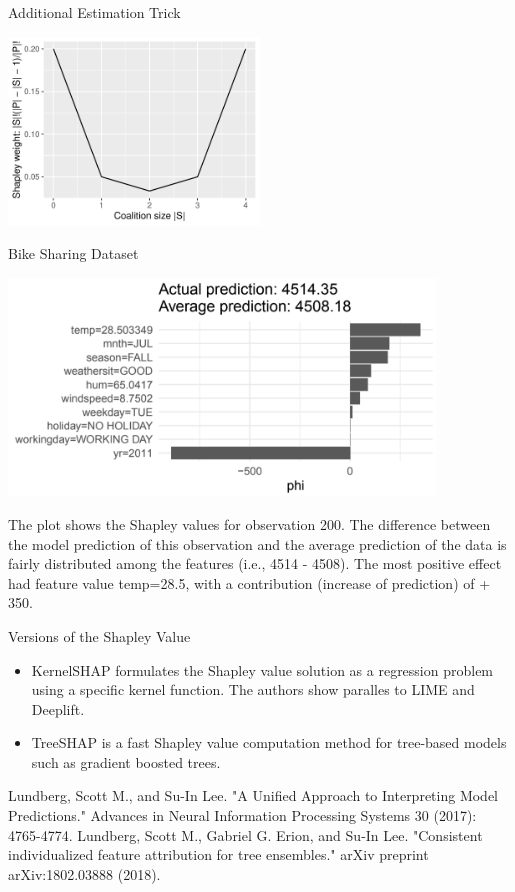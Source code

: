 \documentclass[11pt,compress,t,notes=noshow, xcolor=table]{beamer}
\begin{document}
\begin{vbframe}{Additional Estimation Trick}
  \begin{center}
    \includegraphics[width=0.5\textwidth]{figure/shapley-weights}
  \end{center}
\end{vbframe}

\begin{vbframe}{Bike Sharing Dataset}

\begin{center}
\includegraphics[width=0.85\textwidth]{figure_man/bike-sharing03.png}
\end{center}

The plot shows the Shapley values for observation 200.
The difference between the model prediction of this observation and the average prediction of the data is fairly distributed among the features (i.e., 4514 - 4508).
The most positive effect had feature value temp=28.5, with a contribution (increase of prediction) of + 350.
\end{vbframe}

\begin{vbframe}{Versions of the Shapley Value}

  \begin{itemize}
  \item KernelSHAP formulates the Shapley value solution as a regression problem using a specific kernel function. The authors show paralles to LIME and Deeplift.
  \item TreeSHAP is a fast Shapley value computation method for tree-based models such as gradient boosted trees.
 \end{itemize}
    \tiny{Lundberg, Scott M., and Su-In Lee. "A Unified Approach to Interpreting Model Predictions." Advances in Neural Information Processing Systems 30 (2017): 4765-4774.}
    \tiny{Lundberg, Scott M., Gabriel G. Erion, and Su-In Lee. "Consistent individualized feature attribution for tree ensembles." arXiv preprint arXiv:1802.03888 (2018).}
\end{vbframe}




\endlecture
\end{document}
